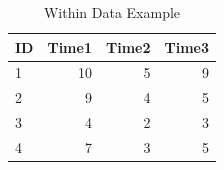 \begin{table}[ht]
	\centering
	\caption{Within Data Example}
	\begin{tabular}{lrrr}
		\hline
		ID & Time1 & Time2 & Time3 \\
		\hline
		1  & 10    & 5     & 9     \\
		2  & 9     & 4     & 5     \\
		3  & 4     & 2     & 3     \\
		4  & 7     & 3     & 5     \\
		\hline
	\end{tabular}
	\label{tbl::23_03}
\end{table}

